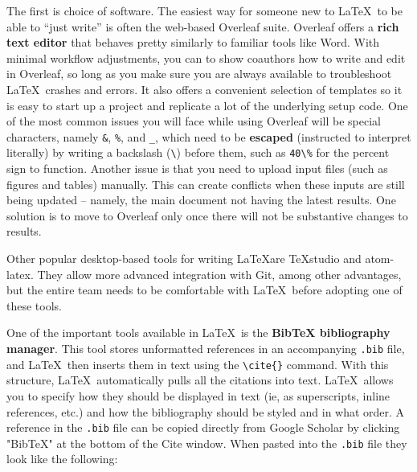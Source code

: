 The first is choice of software. The easiest way
for someone new to \LaTeX\ to be able to ``just write''
is often the web-based Overleaf suite.
Overleaf offers a \textbf{rich text editor}
that behaves pretty similarly to familiar tools like Word. 
With minimal workflow adjustments, you can
to show coauthors how to write and edit in Overleaf,
so long as you make sure you are always available to troubleshoot
\LaTeX\ crashes and errors. It also offers a convenient selection of templates
so it is easy to start up a project
and replicate a lot of the underlying setup code.
One  of the most common issues you will face while using Overleaf will be special characters, namely
\texttt{\&}, \texttt{\%}, and \texttt{\_},
which need to be \textbf{escaped} (instructed to interpret literally)
by writing a backslash (\texttt{\textbackslash}) before them,
such as  \texttt{40\textbackslash\%} for the percent sign to function.
Another issue is that you need to upload input files
(such as figures and tables) manually.
This can create conflicts when these inputs are still being updated --
namely, the main document not having the latest results.
One solution is to move to Overleaf only once there will not be substantive changes to results.

Other popular desktop-based tools for writing \LaTeX are TeXstudio and atom-latex.
They allow more advanced integration with Git,
among other advantages, but the entire team needs to be comfortable
with \LaTeX\ before adopting one of these tools.

One of the important tools available in \LaTeX\ is the \textbf{BibTeX bibliography manager}.
This tool stores unformatted references
in an accompanying \texttt{.bib} file,
and \LaTeX\ then inserts them in text
using the \texttt{\textbackslash cite\{\}} command.
With this structure, \LaTeX\ automatically pulls
all the citations into text. \LaTeX\ allows you to specify
how they should be displayed in text
(ie, as superscripts, inline references, etc.)
and how the bibliography should be styled and in what order.
A reference in the \texttt{.bib} file
can be copied directly from Google Scholar
by clicking "BibTeX" at the bottom of the Cite window.
When pasted into the \texttt{.bib} file they look like the following:


